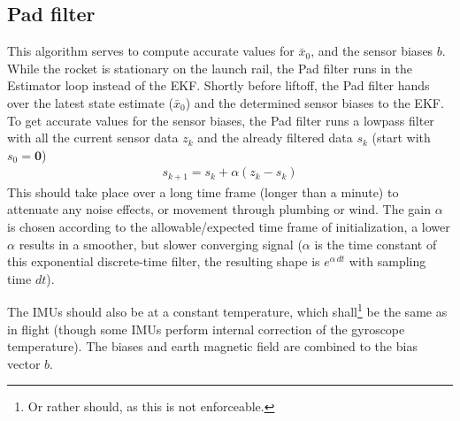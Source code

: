 \subsection{Pad filter}
\label{sec:estimator-initialization}
This algorithm serves to compute accurate values for $\bar x_0$, and the sensor biases $b$.
While the rocket is stationary on the launch rail, the Pad filter runs in the Estimator loop instead of the EKF.
Shortly before liftoff, the Pad filter hands over the latest state estimate ($\bar x_0$) and the determined sensor biases to the EKF.
To get accurate values for the sensor biases, the Pad filter runs a lowpass filter with all the current sensor data $z_k$ and the already filtered data $s_k$ (start with $s_0 = \bm 0$)
\begin{align}
    s_{k+1} = s_k + \alpha (z_k - s_k)
\end{align}
This should take place over a long time frame (longer than a minute) to attenuate any noise effects, or movement through plumbing or wind.
The gain $\alpha$ is chosen according to the allowable/expected time frame of initialization, a lower $\alpha$ results in a smoother, but slower converging signal ($\alpha$ is the time constant of this exponential discrete-time filter, the resulting shape is $e^{\alpha \, dt}$ with sampling time $dt$).

The IMUs should also be at a constant temperature, which shall\footnote{Or rather should, as this is not enforceable.} be the same as in flight (though some IMUs perform internal correction of the gyroscope temperature).
The biases and earth magnetic field are combined to the bias vector $b$.

